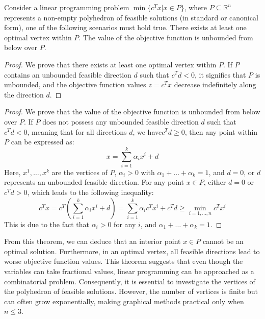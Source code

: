 \begin{theorem}
    Consider a linear programming problem $\min\{c^Tx|x \in P\}$, where $P \subseteq \mathbb{R}^n$ represents a non-empty polyhedron of feasible solutions (in standard or canonical form), one of the following scenarios must hold true.
    There exists at least one optimal vertex within $P$.
    The value of the objective function is unbounded from below over $P$.
\end{theorem}
\begin{proof}
    We prove that there exists at least one optimal vertex within $P$.
    If $P$ contains an unbounded feasible direction $d$ such that $c^Td < 0$, it signifies that $P$ is unbounded, and the objective function values $z=c^Tx$ decrease indefinitely along the direction $d$. 
\end{proof}
\begin{proof}
    We prove that the  value of the objective function is unbounded from below over $P$.
    If $P$ does not possess any unbounded feasible direction $d$ such that $c^Td < 0$, meaning that for all directions $d$, we have$c^Td \geq 0$, then any point within $P$ can be expressed as: 
    \[x=\sum_{i=1}^k{\alpha_ix^i + d}\]
    Here, $x^1,\dots,x^k$ are the vertices of $P$, $\alpha_i > 0$ with $\alpha_1+\dots+\alpha_k=1$, and $d = 0$, or $d$ represents an unbounded feasible direction.
    For any point $x \in P$, either $d = 0$ or $c^Td > 0$, which leads to the following inequality:
    \[c^Tx=c^T\left(\sum_{i=1}^{k}{\alpha_ix^i+d}\right)=\sum_{i=1}^{k}{\alpha_ic^Tx^i+c^Td}\geq\min_{i=1,\dots,n}{c^Tx^i}\]
    This is due to the fact that $\alpha_i > 0$ for any $i$, and $\alpha_1+\dots+\alpha_k=1$. 
\end{proof}
From this theorem, we can deduce that an interior point $x \in P$ cannot be an optimal solution. 
Furthermore, in an optimal vertex, all feasible directions lead to worse objective function values.
This theorem suggests that even though the variables can take fractional values, linear programming can be approached as a combinatorial problem.
Consequently, it is essential to investigate the vertices of the polyhedron of feasible solutions.
However, the number of vertices is finite but can often grow exponentially, making graphical methods practical only when $n \leq 3$. 
